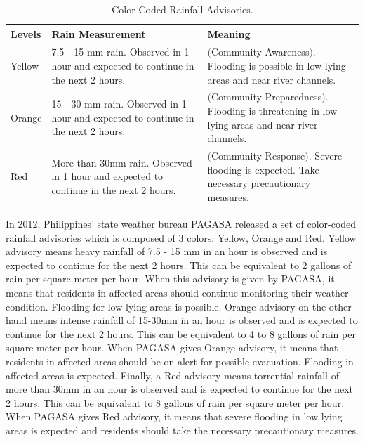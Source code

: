 \documentclass[runningheads]{llncs}
\begin{document}
\begin{table}[htbp]
\centering
\caption{Color-Coded Rainfall Advisories.}\label{tab1}
\begin{tabular}{|p{1.5cm}|p{5cm}|p{5cm}|}
\hline
Levels &  Rain Measurement & Meaning\\
\hline
Yellow &  7.5 - 15 mm rain. Observed in 1 hour and expected to continue in the next 2 hours. & $($Community Awareness$)$. Flooding is possible in low lying areas and near river channels.\\
Orange &  15 - 30 mm rain. Observed in 1 hour and expected to continue in the next 2 hours. & $($Community Preparedness$)$. Flooding is threatening in low-lying areas and near river channels.\\
Red & More than 30mm rain. Observed in 1 hour and expected to continue in the next 2 hours. & $($Community Response$)$. Severe flooding is expected. Take necessary precautionary measures.\\
\hline
\end{tabular}
\end{table}


In 2012, Philippines' state weather bureau PAGASA released a set of color-coded rainfall advisories which is composed of 3 colors: Yellow, Orange and Red. Yellow advisory means heavy rainfall of 7.5 - 15 mm in an hour is observed and is expected to continue for the next 2 hours. This can be equivalent to 2 gallons of rain per square meter per hour. When this advisory is given by PAGASA, it means that residents in affected areas should continue monitoring their weather condition. Flooding for low-lying areas is possible. Orange advisory on the other hand means intense rainfall of 15-30mm in an hour is observed and is expected to continue for the next 2 hours. This can be equivalent to 4 to 8 gallons of rain per square meter per hour. When PAGASA gives Orange advisory, it means that residents in affected areas should be on alert for possible evacuation. Flooding in affected areas is expected. Finally, a Red advisory means torrential rainfall of more than 30mm in an hour is observed and is expected to continue for the next 2 hours. This can be equivalent to 8 gallons of rain per square meter per hour. When PAGASA gives Red advisory, it means that severe flooding in low lying areas is expected and residents should take the necessary precautionary measures.

\end{document}
